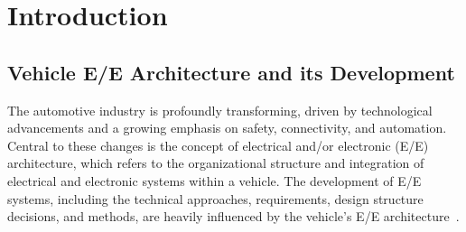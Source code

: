 \chapter{Introduction}\label{intro}%


	
	
	
	
    \section{Vehicle E/E Architecture and its Development}\label{eeArch}
    The automotive industry is profoundly transforming, driven by technological advancements and a growing emphasis on safety, connectivity, and automation. Central to these changes is the concept of electrical and/or electronic (E/E) architecture, which refers to the organizational structure and integration of electrical and electronic systems within a vehicle.
    The development of E/E systems, including the technical approaches, requirements, design structure decisions, and methods, are heavily influenced by the vehicle's E/E architecture~\cite{9565115,askaripoor2023designer}. 
    
